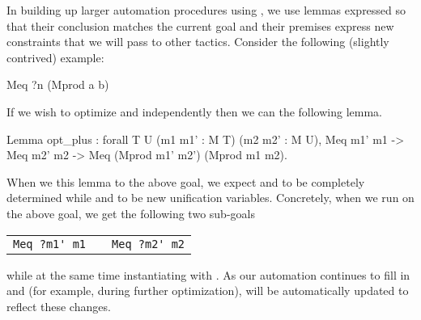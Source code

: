 \documentclass[preprint]{sigplanconf}
\newcommand{\ltac}[0]{\ensuremath{\mathcal{L}_{\mathrm{tac}}}}
\begin{document}
In building up larger automation procedures using , we use lemmas expressed so that their conclusion matches the current goal and their premises express new constraints that we will pass to other tactics.
Consider the following (slightly contrived) example:
\begin{coq}
Meq ?n (Mprod a b)
\end{coq}
If we wish to optimize  and  independently then we can  the following lemma.
\begin{coq}
Lemma opt_plus : forall {T U} (m1 m1' : M T) (m2 m2' : M U),
  Meq m1' m1 ->
  Meq m2' m2 ->
  Meq (Mprod m1' m2') (Mprod m1 m2).
\end{coq}
When we  this lemma to the above goal, we expect  and  to be completely determined while  and  to be new unification variables.
Concretely, when we run  on the above goal, we get the following two sub-goals
\begin{center}
\begin{tabular}{ccc}
\lstinline!Meq ?m1' m1! & \qquad & \lstinline!Meq ?m2' m2! \\
\end{tabular}
\end{center}
while at the same time instantiating  with .
As our automation continues to fill in  and  (for example, during further optimization),  will be automatically updated to reflect these changes.  





\end{document}
